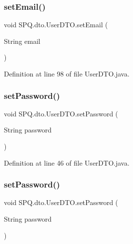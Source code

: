 \subsubsection{\texorpdfstring{set\+Email()}{setEmail()}\hspace{0.1cm}{\footnotesize\ttfamily [3/3]}}
{\footnotesize\ttfamily void S\+P\+Q.\+dto.\+User\+D\+T\+O.\+set\+Email (\begin{DoxyParamCaption}\item[{String}]{email }\end{DoxyParamCaption})}



Definition at line 98 of file User\+D\+T\+O.\+java.

\mbox{\label{class_s_p_q_1_1dto_1_1_user_d_t_o_a35bd2d50e194e3d923e8adcf229e5a3e}} 
\subsubsection{\texorpdfstring{set\+Password()}{setPassword()}\hspace{0.1cm}{\footnotesize\ttfamily [1/3]}}
{\footnotesize\ttfamily void S\+P\+Q.\+dto.\+User\+D\+T\+O.\+set\+Password (\begin{DoxyParamCaption}\item[{String}]{password }\end{DoxyParamCaption})}



Definition at line 46 of file User\+D\+T\+O.\+java.

\mbox{\label{class_s_p_q_1_1dto_1_1_user_d_t_o_a35bd2d50e194e3d923e8adcf229e5a3e}} 
\subsubsection{\texorpdfstring{set\+Password()}{setPassword()}\hspace{0.1cm}{\footnotesize\ttfamily [2/3]}}
{\footnotesize\ttfamily void S\+P\+Q.\+dto.\+User\+D\+T\+O.\+set\+Password (\begin{DoxyParamCaption}\item[{String}]{password }\end{DoxyParamCaption})}



